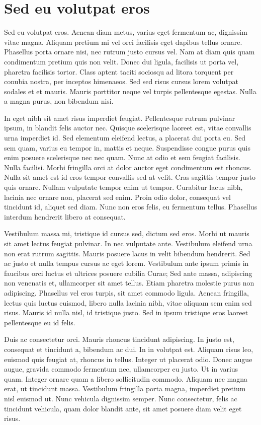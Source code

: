 \section{Sed eu volutpat eros}
Sed eu volutpat eros.
Aenean diam metus, varius eget fermentum ac, dignissim vitae magna.
Aliquam pretium mi vel orci facilisis eget dapibus tellus ornare.
Phasellus porta ornare nisi, nec rutrum justo cursus vel.
Nam at diam quis quam condimentum pretium quis non velit.
Donec dui ligula, facilisis ut porta vel, pharetra facilisis tortor.
Class aptent taciti sociosqu ad litora torquent per conubia nostra, per inceptos himenaeos.
Sed sed risus cursus lorem volutpat sodales et et mauris.
Mauris porttitor neque vel turpis pellentesque egestas.
Nulla a magna purus, non bibendum nisi.

In eget nibh sit amet risus imperdiet feugiat.
Pellentesque rutrum pulvinar ipsum, in blandit felis auctor nec.
Quisque scelerisque laoreet est, vitae convallis urna imperdiet id.
Sed elementum eleifend lectus, a placerat dui porta eu.
Sed sem quam, varius eu tempor in, mattis et neque.
Suspendisse congue purus quis enim posuere scelerisque nec nec quam.
Nunc at odio et sem feugiat facilisis.
Nulla facilisi.
Morbi fringilla orci at dolor auctor eget condimentum est rhoncus.
Nulla sit amet est id eros tempor convallis sed at velit.
Cras sagittis tempor justo quis ornare.
Nullam vulputate tempor enim ut tempor.
Curabitur lacus nibh, lacinia nec ornare non, placerat sed enim.
Proin odio dolor, consequat vel tincidunt id, aliquet sed diam.
Nunc non eros felis, eu fermentum tellus.
Phasellus interdum hendrerit libero at consequat.

Vestibulum massa mi, tristique id cursus sed, dictum sed eros.
Morbi ut mauris sit amet lectus feugiat pulvinar.
In nec vulputate ante.
Vestibulum eleifend urna non erat rutrum sagittis.
Mauris posuere lacus in velit bibendum hendrerit.
Sed ac justo et nulla tempus cursus ac eget lorem.
Vestibulum ante ipsum primis in faucibus orci luctus et ultrices posuere cubilia Curae; Sed ante massa, adipiscing non venenatis et, ullamcorper sit amet tellus.
Etiam pharetra molestie purus non adipiscing.
Phasellus vel eros turpis, sit amet commodo ligula.
Aenean fringilla, lectus quis luctus euismod, libero nulla lacinia nibh, vitae aliquam sem enim sed risus.
Mauris id nulla nisl, id tristique justo.
Sed in ipsum tristique eros laoreet pellentesque eu id felis.

Duis ac consectetur orci.
Mauris rhoncus tincidunt adipiscing.
In justo est, consequat et tincidunt a, bibendum ac dui.
In in volutpat est.
Aliquam risus leo, euismod quis feugiat at, rhoncus in tellus.
Integer ut placerat odio.
Donec augue augue, gravida commodo fermentum nec, ullamcorper eu justo.
Ut in varius quam.
Integer ornare quam a libero sollicitudin commodo.
Aliquam nec magna erat, ut tincidunt massa.
Vestibulum fringilla porta magna, imperdiet pretium nisl euismod ut.
Nunc vehicula dignissim semper.
Nunc consectetur, felis ac tincidunt vehicula, quam dolor blandit ante, sit amet posuere diam velit eget risus.

